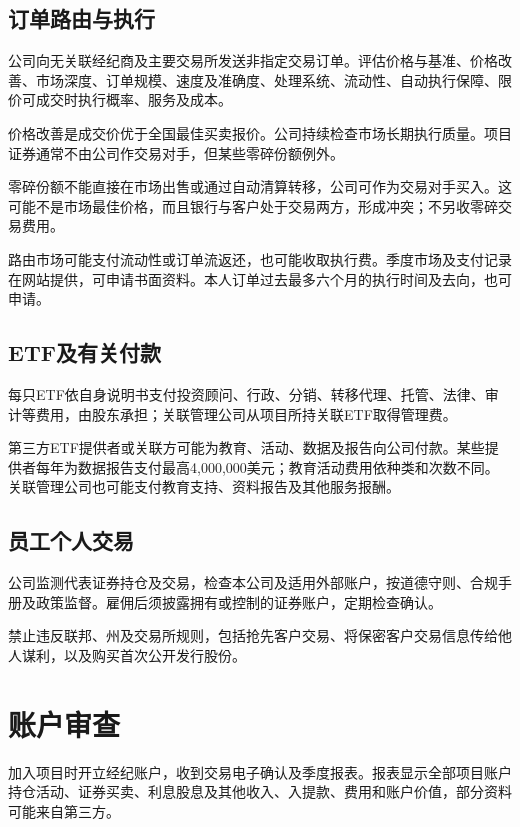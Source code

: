 \documentclass[UTF8,fontset=none,11pt,a4paper]{ctexart}
\begin{document}
\subsection*{订单路由与执行}
公司向无关联经纪商及主要交易所发送非指定交易订单。评估价格与基准、价格改善、市场深度、订单规模、速度及准确度、处理系统、流动性、自动执行保障、限价可成交时执行概率、服\allowbreak\mbox{务及成本。}


价格改善是成交价优于全国最佳买卖报价。公司持续检查市场长期执行质量。项目证券通常不由公司作交易对手，但某些零碎\allowbreak\mbox{份额例外。}


零碎份额不能直接在市场出售或通过自动清算转移，公司可作为交易对手买入。这可能不是市场最佳价格，而且银行与客户处于交易两方，形成冲突；不另收零碎\allowbreak\mbox{交易费用。}


路由市场可能支付流动性或订单流返还，也可能收取执行费。季度市场及支付记录在网站提供，可申请书面资料。本人订单过去最多六个月的执行时间及去向，\allowbreak\mbox{也可申请。}


\subsection*{ETF及有关付款}
每只ETF依自身说明书支付投资顾问、行政、分销、转移代理、托管、法律、审计等费用，由股东承担；关联管理公司从项目所持关联ETF取\allowbreak\mbox{得管理费。}


第三方ETF提供者或关联方可能为教育、活动、数据及报告向公司付款。某些提供者每年为数据报告支付最高4,000,000美元；教育活动费用依种类和次数不同。关联管理公司也可能支付教育支持、资料报告及其他\allowbreak\mbox{服务报酬。}


\subsection*{员工个人交易}
公司监测代表证券持仓及交易，检查本公司及适用外部账户，按道德守则、合规手册及政策监督。雇佣后须披露拥有或控制的证券账户，定期\allowbreak\mbox{检查确认。}


禁止违反联邦、州及交易所规则，包括抢先客户交易、将保密客户交易信息传给他人谋利，以及购买首次公开\allowbreak\mbox{发行股份。}


\section*{账户审查}
加入项目时开立经纪账户，收到交易电子确认及季度报表。报表显示全部项目账户持仓活动、证券买卖、利息股息及其他收入、入提款、费用和账户价值，部分资料可能来\allowbreak\mbox{自第三方。}
\end{document}
